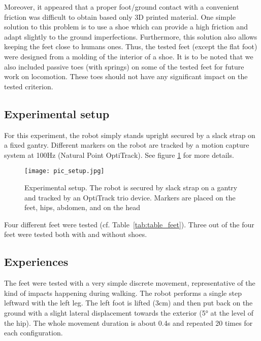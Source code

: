 Moreover, it appeared that a proper foot/ground contact with a convenient friction was difficult to obtain based only 3D printed material. One simple solution to this problem is to use a shoe which can provide a high friction and adapt slightly to the ground imperfections. Furthermore, this solution also allows keeping the feet close to humans ones. Thus, the tested feet (except the flat foot) were designed from a molding of the interior of a shoe. It is to be noted that we also included passive toes (with springs) on some of the tested feet for future work on locomotion. These toes should not have any significant impact on the tested criterion.


\subsection{Experimental setup} %
\label{sub:experimental_setup}

For this experiment, the robot simply stands upright secured by a slack strap on a fixed gantry. Different markers on the robot are tracked by a motion capture system at 100Hz (Natural Point OptiTrack). See figure \ref{fig:setup} for more details.

\begin{figure}[ht]
    \begin{center}
        \texttt{[image: pic\_setup.jpg]}
    \end{center}
    \caption{Experimental setup. The robot is secured by slack strap on a gantry and tracked by an OptiTrack trio device. Markers are placed on the feet, hips, abdomen, and on the head}
    \label{fig:setup}
\end{figure}

Four different feet were tested (cf. Table~\ref{tab:table_feet}). Three out of the four feet were tested both with and without shoes.


\subsection{Experiences} %

The feet were tested with a very simple discrete movement, representative of the kind of impacts happening during walking. The robot performs a single step leftward with the left leg. The left foot is lifted (3cm) and then put back on the ground with a slight lateral displacement towards the exterior (5° at the level of the hip). The whole movement duration is about 0.4s and repeated 20 times for each configuration.


